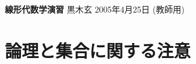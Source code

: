\documentclass[12pt,twoside]{jarticle}
\newcommand\commentout[1]{#1}
\newcommand\commentout[1]{}
\begin{document}

%
%



\noindent
{\Large\bf 線形代数学演習}
\hfill
{\large 黒木玄}
\qquad
2005年4月25日
\commentout{\quad (教師用)}


\tableofcontents


\section*{論理と集合に関する注意}
\end{document}
